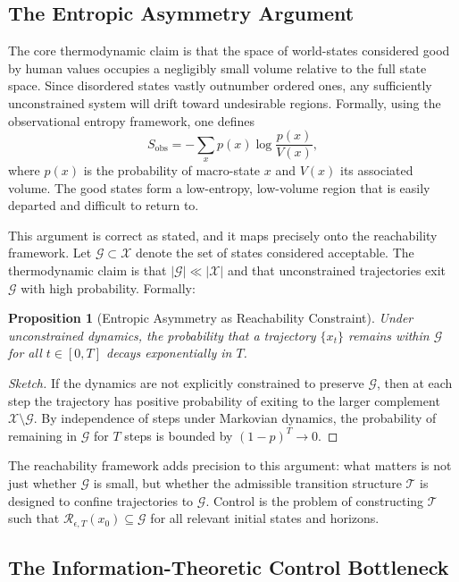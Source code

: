 \documentclass[12pt]{article}
\theoremstyle{plain}
\newtheorem{proposition}[theorem]{Proposition}
\theoremstyle{definition}
\theoremstyle{remark}
\begin{document}
\subsection{The Entropic Asymmetry Argument}

The core thermodynamic claim is that the space of world-states considered good by human values occupies a negligibly small volume relative to the full state space. Since disordered states vastly outnumber ordered ones, any sufficiently unconstrained system will drift toward undesirable regions. Formally, using the observational entropy framework, one defines
\[
S_{\mathrm{obs}} = -\sum_x p(x) \log \frac{p(x)}{V(x)},
\]
where $p(x)$ is the probability of macro-state $x$ and $V(x)$ its associated volume. The good states form a low-entropy, low-volume region that is easily departed and difficult to return to.

This argument is correct as stated, and it maps precisely onto the reachability framework. Let $\mathcal{G} \subset \mathcal{X}$ denote the set of states considered acceptable. The thermodynamic claim is that $|\mathcal{G}| \ll |\mathcal{X}|$ and that unconstrained trajectories exit $\mathcal{G}$ with high probability. Formally:

\begin{proposition}[Entropic Asymmetry as Reachability Constraint]
Under unconstrained dynamics, the probability that a trajectory $\{x_t\}$ remains within $\mathcal{G}$ for all $t \in [0,T]$ decays exponentially in $T$.
\end{proposition}

\begin{proof}[Sketch]
If the dynamics are not explicitly constrained to preserve $\mathcal{G}$, then at each step the trajectory has positive probability of exiting to the larger complement $\mathcal{X} \setminus \mathcal{G}$. By independence of steps under Markovian dynamics, the probability of remaining in $\mathcal{G}$ for $T$ steps is bounded by $(1-p)^T \to 0$.
\end{proof}

The reachability framework adds precision to this argument: what matters is not just whether $\mathcal{G}$ is small, but whether the admissible transition structure $\mathcal{T}$ is designed to confine trajectories to $\mathcal{G}$. Control is the problem of constructing $\mathcal{T}$ such that $\mathcal{R}_{\epsilon,T}(x_0) \subseteq \mathcal{G}$ for all relevant initial states and horizons.

\subsection{The Information-Theoretic Control Bottleneck}
\end{document}
